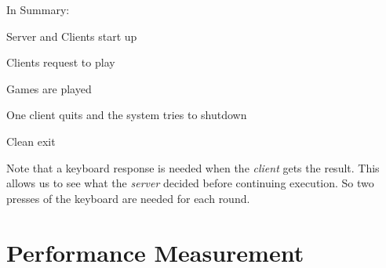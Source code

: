 \documentclass[letterpaper]{article}
\begin{document}
In Summary:
\setcounter{listcnt0}{0}
\begin{list}{.}
{
\setlength{\rightmargin}{\leftmargin}
}

\item Server and Clients start up

\item Clients request to play

\item Games are played

\item One client quits and the system tries to shutdown

\item Clean exit
\end{list}

Note that a keyboard response is needed when the \emph{client} gets the result. This allows us to see what the \emph{server} decided before continuing execution. So two presses of the keyboard are needed for each round.


\section{Performance Measurement%
  \label{performance-measurement}%
}
\end{document}

